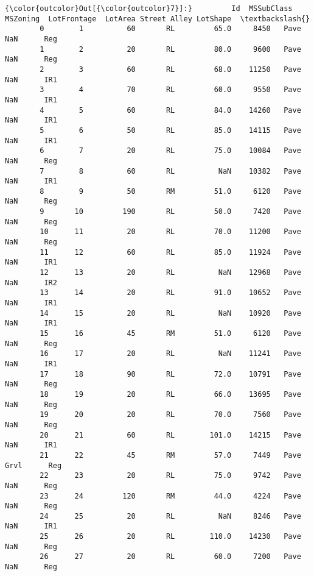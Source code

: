 \documentclass[11pt]{article}
\begin{document}
\begin{Verbatim}[commandchars=\\\{\}]
{\color{outcolor}Out[{\color{outcolor}7}]:}         Id  MSSubClass MSZoning  LotFrontage  LotArea Street Alley LotShape  \textbackslash{}
        0        1          60       RL         65.0     8450   Pave   NaN      Reg   
        1        2          20       RL         80.0     9600   Pave   NaN      Reg   
        2        3          60       RL         68.0    11250   Pave   NaN      IR1   
        3        4          70       RL         60.0     9550   Pave   NaN      IR1   
        4        5          60       RL         84.0    14260   Pave   NaN      IR1   
        5        6          50       RL         85.0    14115   Pave   NaN      IR1   
        6        7          20       RL         75.0    10084   Pave   NaN      Reg   
        7        8          60       RL          NaN    10382   Pave   NaN      IR1   
        8        9          50       RM         51.0     6120   Pave   NaN      Reg   
        9       10         190       RL         50.0     7420   Pave   NaN      Reg   
        10      11          20       RL         70.0    11200   Pave   NaN      Reg   
        11      12          60       RL         85.0    11924   Pave   NaN      IR1   
        12      13          20       RL          NaN    12968   Pave   NaN      IR2   
        13      14          20       RL         91.0    10652   Pave   NaN      IR1   
        14      15          20       RL          NaN    10920   Pave   NaN      IR1   
        15      16          45       RM         51.0     6120   Pave   NaN      Reg   
        16      17          20       RL          NaN    11241   Pave   NaN      IR1   
        17      18          90       RL         72.0    10791   Pave   NaN      Reg   
        18      19          20       RL         66.0    13695   Pave   NaN      Reg   
        19      20          20       RL         70.0     7560   Pave   NaN      Reg   
        20      21          60       RL        101.0    14215   Pave   NaN      IR1   
        21      22          45       RM         57.0     7449   Pave  Grvl      Reg   
        22      23          20       RL         75.0     9742   Pave   NaN      Reg   
        23      24         120       RM         44.0     4224   Pave   NaN      Reg   
        24      25          20       RL          NaN     8246   Pave   NaN      IR1   
        25      26          20       RL        110.0    14230   Pave   NaN      Reg   
        26      27          20       RL         60.0     7200   Pave   NaN      Reg   

\end{Verbatim}
\end{document}
